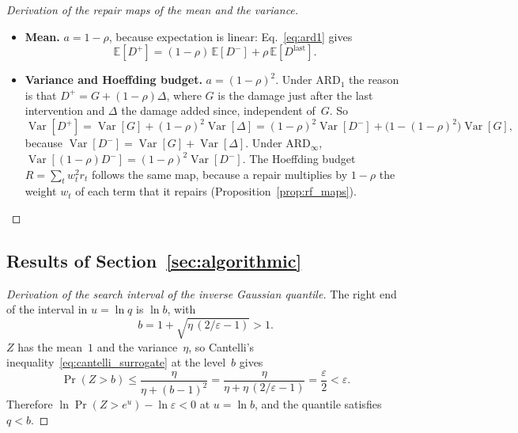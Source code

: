 \documentclass[11pt,a4paper]{article}
\theoremstyle{plain}
\theoremstyle{definition}
\theoremstyle{remark}
\begin{document}
\label{drv:repair_maps}
\begin{proof}[Derivation of the repair maps of the mean and the variance]
\begin{itemize}
  \item \textbf{Mean.} $a = 1-\rho$, because expectation is linear: Eq.~\eqref{eq:ard1} gives
    \begin{equation}
      \mathbb{E}[D^+] = (1-\rho)\,\mathbb{E}[D^-] + \rho\,\mathbb{E}[D^{\mathrm{last}}].
    \end{equation}
  \item \textbf{Variance and Hoeffding budget.} $a = (1-\rho)^2$.
    Under $\text{ARD}_1$ the reason is that $D^+ = G + (1-\rho)\Delta$, where $G$ is the damage just after the last intervention and $\Delta$ the damage added since, independent of~$G$.
    So
    \begin{equation}
      \operatorname{Var}[D^+] = \operatorname{Var}[G] + (1-\rho)^2\operatorname{Var}[\Delta] = (1-\rho)^2\operatorname{Var}[D^-] + \bigl(1-(1-\rho)^2\bigr)\operatorname{Var}[G],
    \end{equation}
    because $\operatorname{Var}[D^-] = \operatorname{Var}[G] + \operatorname{Var}[\Delta]$.
    Under $\text{ARD}_\infty$, $\operatorname{Var}[(1-\rho)D^-] = (1-\rho)^2\operatorname{Var}[D^-]$.
    The Hoeffding budget $R = \sum_t w_t^2 r_t$ follows the same map, because a repair multiplies by $1-\rho$ the weight $w_t$ of each term that it repairs (Proposition~\ref{prop:rf_maps}).
\end{itemize}
\end{proof}

\subsection{Results of Section~\ref{sec:algorithmic}}

\label{drv:ig_bracket}
\begin{proof}[Derivation of the search interval of the inverse Gaussian quantile]
The right end of the interval in $u = \ln q$ is $\ln b$, with
\begin{equation}
  b = 1 + \sqrt{\eta\,(2/\varepsilon - 1)} > 1.
\end{equation}
$Z$ has the mean~$1$ and the variance~$\eta$, so Cantelli's inequality~\eqref{eq:cantelli_surrogate} at the level~$b$ gives
\begin{equation}
  \Pr(Z > b) \le \frac{\eta}{\eta + (b-1)^2} = \frac{\eta}{\eta + \eta\,(2/\varepsilon - 1)} = \frac{\varepsilon}{2} < \varepsilon.
\end{equation}
Therefore $\ln\Pr(Z > e^u) - \ln\varepsilon < 0$ at $u = \ln b$, and the quantile satisfies $q < b$.
\end{proof}
\end{document}
